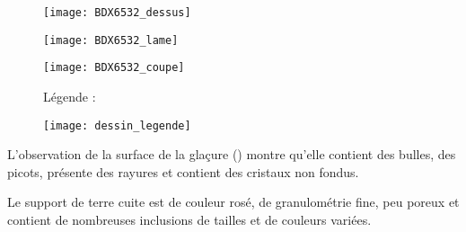 \begin{figure}[htb]
  \begin{minipage}[t]{0.5\textwidth}
    \centerfloat
    \vspace*{0pt}
    \texttt{[image: BDX6532\_dessus]}
  \end{minipage}%
  \quad%
  \begin{minipage}[t]{0.5\textwidth}
    \centerfloat
    \vspace*{0pt}
    \texttt{[image: BDX6532\_lame]}
  \end{minipage}

  \bigskip

  \begin{minipage}[t]{0.5\textwidth}
    \centerfloat
    \vspace*{0pt}
    \texttt{[image: BDX6532\_coupe]}
  \end{minipage}%
  \quad%
  \begin{minipage}[t]{0.5\textwidth}
    \vspace*{0pt}
    Légende :

    \texttt{[image: dessin\_legende]}
  \end{minipage}
  \caption{\legendeE}
  \label{dessin:6532}
\end{figure}

L'observation de la surface de la glaçure () montre 
qu'elle contient des bulles, des picots, présente des rayures et 
contient des cristaux non fondus.

Le support de terre cuite est de couleur rosé, de granulométrie 
fine, peu poreux et contient de nombreuses inclusions de tailles 
et de couleurs variées.

